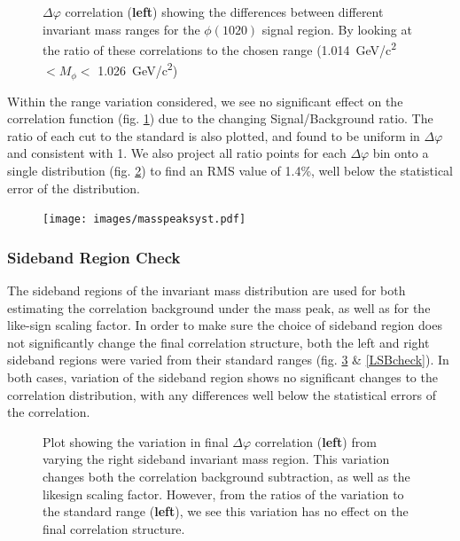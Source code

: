 \documentclass[ALICE,manyauthors]{ALICE_analysis_notes}
\begin{document}
\begin{figure}[ht]
\centering
\begin{subfigure}{
\texttt{[image: images/masspeakdphi.pdf]}}
\end{subfigure}
\begin{subfigure}{
\texttt{[image: images/masspeakratios.pdf]}}
\end{subfigure}
\caption{$\Delta\varphi$ correlation (\textbf{left}) showing the differences between different invariant mass ranges for the $\phi(1020)$ signal region.  By looking at the ratio of these correlations to the chosen range (\SI{1.014}{GeV/c^2}$ < M_{\phi} <$ \SI{1.026}{GeV/c^2})}
\label{masspeakcheck}
\end{figure}

Within the range variation considered, we see no significant effect on the correlation function (fig. \ref{masspeakcheck}) due to the changing Signal/Background ratio. The ratio of each cut to the standard is also plotted, and found to be uniform in $\Delta\varphi$ and consistent with 1.  We also project all ratio points for each $\Delta\varphi$ bin onto a single distribution (fig. \ref{masspeakRMS}) to find an RMS value of 1.4\%, well below the statistical error of the distribution.

\begin{figure}[ht]
\centering
\texttt{[image: images/masspeaksyst.pdf]}
\caption{ }
\label{masspeakRMS}
\end{figure}


\subsubsection{Sideband Region Check}

The sideband regions of the invariant mass distribution are used for both estimating the correlation background under the mass peak, as well as for the like-sign scaling factor.  In order to make sure the choice of sideband region does not significantly change the final correlation structure, both the left and right sideband regions were varied from their standard ranges (fig. \ref{RSBcheck} \& \ref{LSBcheck}).  In both cases, variation of the sideband region shows no significant changes to the correlation distribution, with any differences well below the statistical errors of the correlation.

\begin{figure}[ht]
\centering
\begin{subfigure}{
\texttt{[image: images/RSBrangedphi.pdf]}}
\end{subfigure}
\begin{subfigure}{
\texttt{[image: images/RSBrangeratios.pdf]}}
\end{subfigure}
\caption{Plot showing the variation in final $\Delta\varphi$ correlation (\textbf{left}) from varying the right sideband invariant mass region.  This variation changes both the correlation background subtraction, as well as the likesign scaling factor. However, from the ratios of the variation to the standard range (\textbf{left}), we see this variation has no effect on the final correlation structure.}
\label{RSBcheck}
\end{figure}
\end{document}
